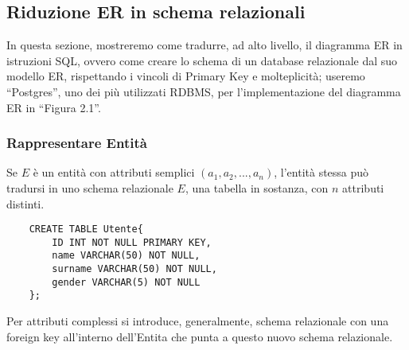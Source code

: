 \documentclass[a4paper,12pt]{report}
\begin{document}
\subsection{Riduzione ER in schema relazionali}
In questa sezione, mostreremo come tradurre, ad alto livello, il diagramma ER in istruzioni SQL, ovvero come creare lo schema di un database relazionale dal suo modello ER, rispettando i vincoli di Primary Key e molteplicità; useremo “Postgres”, uno dei più utilizzati RDBMS, per l’implementazione del diagramma ER in “Figura 2.1”.

\subsubsection{Rappresentare Entità}
Se $E$ è un entità con attributi semplici $(a_1,a_2,...,a_n)$, l’entità stessa può tradursi in uno schema relazionale $E$, una tabella in sostanza, con $n$ attributi distinti.
\begin{verbatim}
    CREATE TABLE Utente{
        ID INT NOT NULL PRIMARY KEY,
        name VARCHAR(50) NOT NULL,
        surname VARCHAR(50) NOT NULL,
        gender VARCHAR(5) NOT NULL
    };
\end{verbatim}

\noindent
Per attributi complessi si introduce, generalmente, schema relazionale con una foreign key all'interno dell'Entita che punta a questo nuovo schema relazionale.
\end{document}

